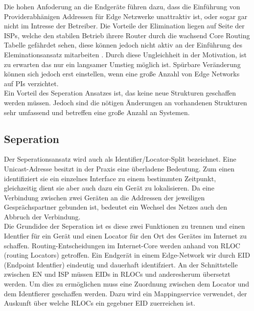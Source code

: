 Die hohen Anfoderung an die Endgeräte führen dazu, dass die Einführung von Providerabhänigen Addressen für Edge Netzwerke unattraktiv ist, oder sogar gar nicht im Intresse der Betreiber. Die Vorteile der Elimination liegen auf Seite der ISPs, welche den stabilen Betrieb ihrere Router durch die wachsend Core Routing Tabelle gefährdet sehen, diese können jedoch nicht aktiv an der Einführung des Eleminationsansatz mitarbeiten \cite{jen:2008:start}. Durch diese Ungleichheit in der Motivation, ist zu erwarten das nur ein langsamer Umstieg möglich ist. Spürbare Veränderung können sich jedoch erst einstellen, wenn eine große Anzahl von Edge Networks auf PIs verzichtet. \\

Ein Vorteil des Seperation Ansatzes ist, das keine neue Strukturen geschaffen werden müssen. Jedoch sind die nötigen Änderungen an vorhandenen Strukturen sehr umfassend und betreffen eine große Anzahl an Systemen.

\subsection{Seperation} %
Der Seperationsansatz wird auch als Identifier/Locator-Split bezeichnet. Eine Unicast-Adresse besitzt in der Praxis eine überladene Bedeutung. Zum einen identifiziert sie ein einzelnes Interface zu einem bestimmten Zeitpunkt, gleichzeitig dient sie aber auch dazu ein Gerät zu lokalisieren. Da eine Verbindung zwischen zwei Geräten an die Addressen der jeweiligen Gesprächspartner gebunden ist, bedeutet ein Wechsel des Netzes auch den Abbruch der Verbindung.  \\

Die Grundidee der Seperation ist es diese zwei Funktionen zu trennen und einen Identfier für ein Gerät und einen Locator für den Ort des Gerätes im Internet zu schaffen. Routing-Entscheidungen im Internet-Core werden anhand von RLOC (routing Locators) getroffen. Ein Endgerät in einem Edge-Network wir durch EID (Endpoint Identfier) eindeutig und dauerhaft identifziert. An der Schnittstelle zwischen EN und ISP müssen EIDs in RLOCs und anderesherum übersetzt werden. Um dies zu ermöglichen muss eine Zuordnung zwischen dem Locator und dem Identfierer geschaffen werden. Dazu wird ein Mappingservice verwendet, der Auskunft über welche RLOCs ein gegebner EID zuerreichen ist. 

